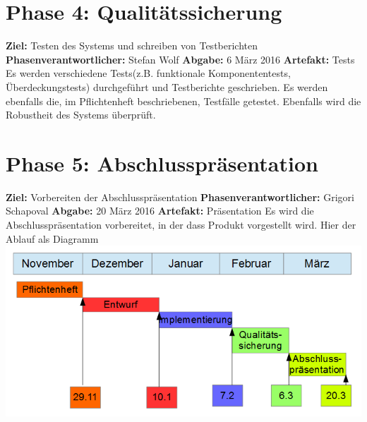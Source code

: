 \section{Phase 4: Qualitätssicherung}
\textbf{Ziel:} Testen des Systems und schreiben von Testberichten \newline
\textbf{Phasenverantwortlicher:} Stefan Wolf  \newline
\textbf{Abgabe:} 6 März 2016 \newline
\textbf{Artefakt:} Tests \newline
Es werden verschiedene Tests(z.B. funktionale Komponententests, Überdeckungstests) durchgeführt und Testberichte geschrieben. Es werden ebenfalls die, im Pflichtenheft beschriebenen, Testfälle getestet. Ebenfalls wird die Robustheit des Systems überprüft.

\section{Phase 5: Abschlusspräsentation}
\textbf{Ziel:} Vorbereiten der Abschlusspräsentation \newline
\textbf{Phasenverantwortlicher:} Grigori Schapoval  \newline
\textbf{Abgabe:} 20 März 2016 \newline
\textbf{Artefakt:} Präsentation \newline
Es wird die Abschlusspräsentation vorbereitet, in der dass Produkt vorgestellt wird. \newline
\newline
\newline
Hier der Ablauf als Diagramm \newline
\includegraphics{img/ablauf.png}